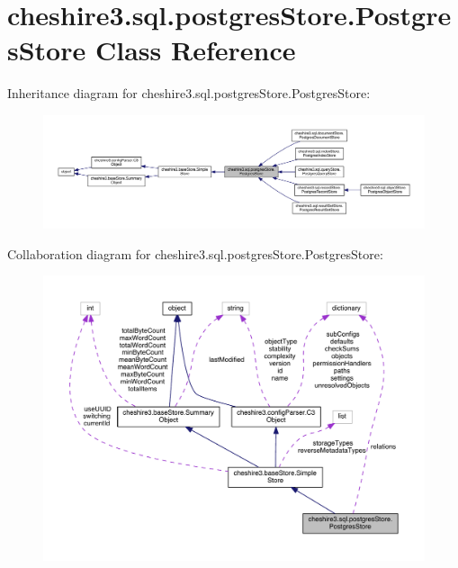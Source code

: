 \hypertarget{classcheshire3_1_1sql_1_1postgres_store_1_1_postgres_store}{\section{cheshire3.\-sql.\-postgres\-Store.\-Postgres\-Store Class Reference}
\label{classcheshire3_1_1sql_1_1postgres_store_1_1_postgres_store}
}


Inheritance diagram for cheshire3.\-sql.\-postgres\-Store.\-Postgres\-Store\-:
\nopagebreak
\begin{figure}[H]
\begin{center}
\leavevmode
\includegraphics[width=350pt]{classcheshire3_1_1sql_1_1postgres_store_1_1_postgres_store__inherit__graph}
\end{center}
\end{figure}


Collaboration diagram for cheshire3.\-sql.\-postgres\-Store.\-Postgres\-Store\-:
\nopagebreak
\begin{figure}[H]
\begin{center}
\leavevmode
\includegraphics[width=350pt]{classcheshire3_1_1sql_1_1postgres_store_1_1_postgres_store__coll__graph}
\end{center}
\end{figure}

